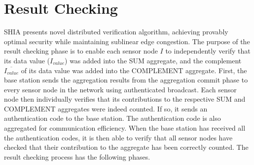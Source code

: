 \section{Result Checking} %
	\label{sec:result_checking}
	SHIA presents novel distributed verification algorithm, achieving provably optimal security while maintaining sublinear edge congestion.
	The purpose of the result checking phase is to enable each sensor node $I$ to independently verify that its data value ($I_{value}$) was added into the SUM aggregate, and the complement $\overline{I_{value}}$ of its data value was added into the COMPLEMENT aggregate.
	First, the base station sends the aggregation results from the aggregation commit phase to every sensor node in the network using authenticated broadcast.
	Each sensor node then individually verifies that its contributions to the respective SUM and COMPLEMENT aggregates were indeed counted.
	If so, it sends an authentication code to the base station.
	The authentication code is also aggregated for communication efficiency. 
	When the base station has received all the authentication codes, it is then able to verify that all sensor nodes have checked that their contribution to the aggregate has been correctly counted.
	The result checking process has the following phases.
	\newpage

